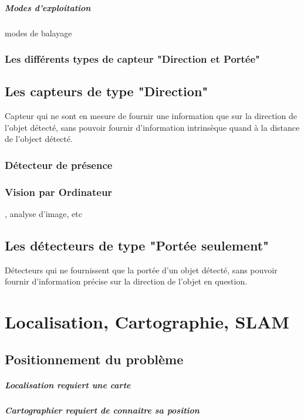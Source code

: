 \documentclass[12pt,a4paper]{report}
\begin{document}
\paragraph{Modes d'exploitation}
modes de balayage

\subsection{Les différents types de capteur "Direction et Portée"}

\section{Les capteurs de type "Direction"}
Capteur qui ne sont en mesure de fournir une information que sur la direction de l'objet détecté, sans pouvoir fournir d'information intrinsèque quand à la distance de l'object détecté.

\subsection{Détecteur de présence}

\subsection{Vision par Ordinateur}, analyse d'image, etc

\section{Les détecteurs de type "Portée seulement"}

Détecteurs qui ne fournissent que la portée d'un objet détecté, sans pouvoir fournir d'information précise sur la direction de l'objet en question.

\chapter{Localisation, Cartographie, SLAM}
\section{Positionnement du problème}

\paragraph{Localisation requiert une carte}

\paragraph{Cartographier requiert de connaître sa position}
\end{document}
